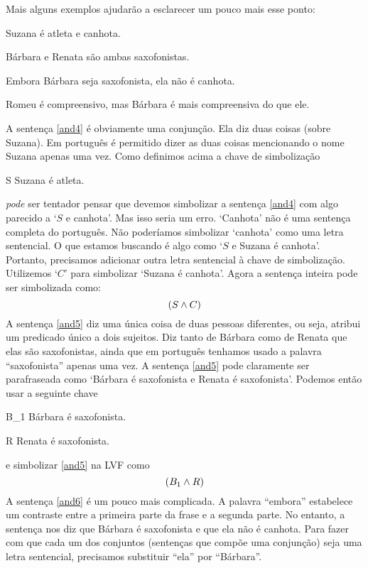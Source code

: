 Mais alguns exemplos ajudarão a esclarecer um pouco mais esse ponto:
	\begin{earg}
		\item[\ex{and4}]Suzana é atleta e canhota.
		\item[\ex{and5}]Bárbara e Renata são ambas saxofonistas.
		\item[\ex{and6}]Embora Bárbara seja saxofonista, ela não é canhota.
		\item[\ex{and7}]Romeu é compreensivo, mas Bárbara é mais compreensiva do que ele.
	\end{earg}
A sentença \ref{and4} é obviamente uma conjunção.
Ela diz duas coisas (sobre Suzana).
Em português é permitido dizer as duas coisas mencionando o nome Suzana apenas uma vez.
Como definimos acima a chave de simbolização 
	\begin{ekey}
		\item[S] Suzana é atleta.
	\end{ekey}
\emph{pode} ser tentador pensar que devemos simbolizar a sentença \ref{and4} com algo parecido a `$S$ e canhota'.
Mas isso seria um erro.
`Canhota' não é uma sentença completa do português.
Não poderíamos simbolizar `canhota' como uma letra sentencial.
O que estamos buscando é algo como `$S$ e Suzana é canhota'.
Portanto, precisamos adicionar outra letra sentencial à chave de simbolização. Utilizemos `$C$' para simbolizar `Suzana é canhota'.
Agora a sentença inteira pode ser simbolizada como:
$$(S \wedge C)$$	
A sentença \ref{and5} diz uma única coisa de duas pessoas diferentes, ou seja, atribui um predicado único a dois sujeitos.
Diz tanto de Bárbara como de Renata que elas são saxofonistas, ainda que em português tenhamos usado a palavra ``saxofonista'' apenas uma vez.
A sentença \ref{and5} pode claramente ser parafraseada como `Bárbara é saxofonista e Renata é saxofonista'.
Podemos então usar a seguinte chave
	\begin{ekey}
		\item[B_1] Bárbara é saxofonista.
		\item[R] Renata é saxofonista.
	\end{ekey}
e simbolizar \ref{and5} na LVF como
$$(B_1 \wedge R)$$
A sentença \ref {and6} é um pouco mais complicada.
A palavra ``embora'' estabelece um contraste entre a primeira parte da frase e a segunda parte.
No entanto, a sentença nos diz que Bárbara é saxofonista e que ela não é canhota.
Para fazer com que cada um dos conjuntos (sentenças que compõe uma conjunção) seja uma letra sentencial, precisamos substituir ``ela'' por ``Bárbara''.
